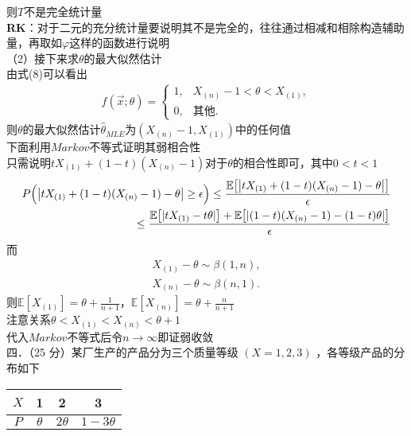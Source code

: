 \documentclass[UTF8,openany]{book}
\begin{document}
	则$T$不是完全统计量\\
	\textbf{RK}：对于二元的充分统计量要说明其不是完全的，往往通过相减和相除构造辅助量，再取如$\varphi$这样的函数进行说明\\
	（2）接下来求$\theta$的最大似然估计\\
	由式(8)可以看出\\
	\begin{gather}
		f(\vec{x};\theta) = \begin{cases}
			1, & X_{(n)}-1<\theta<X_{(1)}, \\
			0, & \text{其他}.
		\end{cases}
	\end{gather}
	则$\theta$的最大似然估计$\hat{\theta}_{MLE}$为$(X_{(n)}-1, X_{(1)})$中的任何值\\
	下面利用$Markov$不等式证明其弱相合性\\
	只需说明$tX_{(1)}+(1-t)(X_{(n)}-1)$对于$\theta$的相合性即可，其中$0<t<1$\\
	$$
	\begin{aligned}
		P\Bigl(\bigl|tX_{(1)}+(1-t)(X_{(n)}-1)-\theta\bigr| \geq \epsilon\Bigr) \leq \frac{\mathbb{E}\bigl[\bigl|tX_{(1)}+(1-t)(X_{(n)}-1)-\theta\bigr|\bigr]}{\epsilon}& \\
		\leq \frac{\mathbb{E}\bigl[|tX_{(1)}-t\theta|\bigr] + \mathbb{E}\bigl[|(1-t)(X_{(n)}-1)-(1-t)\theta|\bigr]}{\epsilon}&
	\end{aligned}
	$$
	而
	\begin{gather}
		X_{(1)}-\theta \sim \beta(1,n), \\
		X_{(n)}-\theta \sim \beta(n,1).
	\end{gather}
	则$\mathbb{E}[X_{(1)}] = \theta + \frac{1}{n+1}$，$\mathbb{E}[X_{(n)}] = \theta + \frac{n}{n+1}$\\
	注意关系$\theta < X_{(1)} < X_{(n)} < \theta + 1$\\
	代入$Markov$不等式后令$n\rightarrow \infty$即证弱收敛\\
	
	
	\noindent 四．（25 分）某厂生产的产品分为三个质量等级 $(X=1,2,3)$ ，各等级产品的分布如下\\
	\begin{center}
		\begin{tabular}{c|ccc}
			\hline
			$X$ & 1 & 2 & 3 \\
			\hline
			$P$ & $\theta$ & $2 \theta$ & $1-3 \theta$ \\
			\hline
		\end{tabular}
	\end{center}
	
\end{document}
